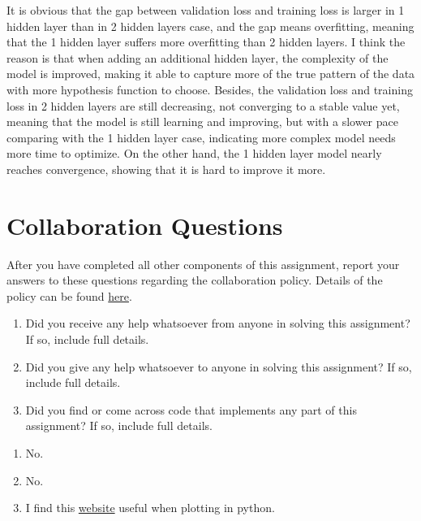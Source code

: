 \documentclass[11pt,addpoints,answers]{exam}
\begin{document}
\begin{questions}
\begin{parts}
\begin{subparts}
\begin{your_solution}[title=Answer,height=4cm,width=14.5cm]
\scriptsize
It is obvious that the gap between validation loss and training loss is larger in 1 hidden layer than in 2 hidden layers case, and the gap means overfitting, meaning that the 1 hidden layer suffers more overfitting than 2 hidden layers. I think the reason is that when adding an additional hidden layer, the complexity of the model is improved, making it able to capture more of the true pattern of the data with more hypothesis function to choose. Besides, the validation loss and training loss in 2 hidden layers are still decreasing, not converging to a stable value yet, meaning that the model is still learning and improving, but with a slower pace comparing with the 1 hidden layer case, indicating more complex model needs more time to optimize. On the other hand, the 1 hidden layer model nearly reaches convergence, showing that it is hard to improve it more.
\end{your_solution}
\end{subparts}



\end{parts}
    \newpage
\newpage
\section{Collaboration Questions}
After you have completed all other components of this assignment, report your answers to these questions regarding the collaboration policy. Details of the policy can be found \href{http://www.cs.cmu.edu/~mgormley/courses/10601/syllabus.html}{here}.
\begin{enumerate}
    \item Did you receive any help whatsoever from anyone in solving this assignment? If so, include full details.
    \item Did you give any help whatsoever to anyone in solving this assignment? If so, include full details.
    \item Did you find or come across code that implements any part of this assignment? If so, include full details.
\end{enumerate}

\begin{your_solution}[height=6cm]
\begin{enumerate}
	\item No.
	\item No.
	\item I find this \href{https://stackoverflow.com/questions/70937689/plotting-multiple-line-graphs-in-matplotlib}{website} useful when plotting in python.
\end{enumerate}
\end{your_solution}
    \newpage
    \end{questions}
    
\end{document}
